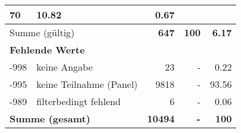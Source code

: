 \begin{longtable}{lXrrr}
       \num{70} &
       \num[round-mode=places,round-precision=2]{10.82} &
         \num[round-mode=places,round-precision=2]{0.67} \\
     \midrule
     \multicolumn{2}{l}{Summe (gültig)} &
       \textbf{\num{647}} &
     \textbf{\num{100}} &
       \textbf{\num[round-mode=places,round-precision=2]{6.17}} \\
     \multicolumn{5}{l}{\textbf{Fehlende Werte}}\\
       -998 &
       keine Angabe &
         \num{23} &
        - &
         \num[round-mode=places,round-precision=2]{0.22} \\
       -995 &
       keine Teilnahme (Panel) &
         \num{9818} &
        - &
         \num[round-mode=places,round-precision=2]{93.56} \\
       -989 &
       filterbedingt fehlend &
         \num{6} &
        - &
         \num[round-mode=places,round-precision=2]{0.06} \\
     \midrule
     \multicolumn{2}{l}{\textbf{Summe (gesamt)}} &
          \textbf{\num{10494}} &
        \textbf{-} &
        \textbf{\num{100}} \\
     \bottomrule
     \end{longtable}
     
